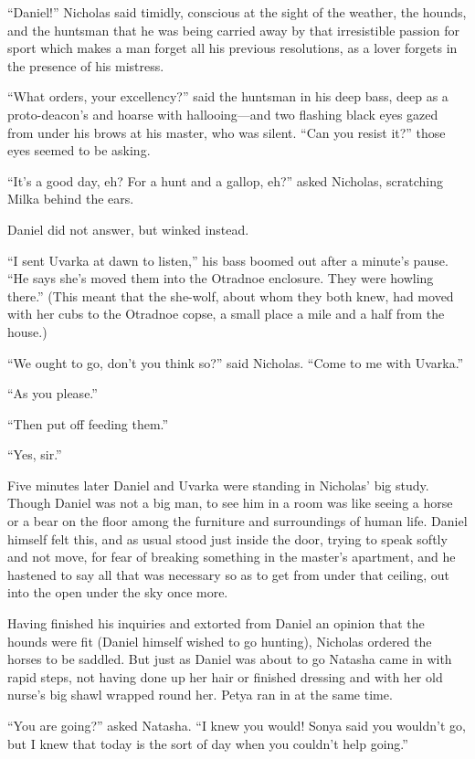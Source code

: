 ``Daniel!'' Nicholas said timidly, conscious at the sight of the
weather, the hounds, and the huntsman that he was being carried
away by that irresistible passion for sport which makes a man
forget all his previous resolutions, as a lover forgets in the
presence of his mistress.

``What orders, your excellency?'' said the huntsman in his deep
bass, deep as a proto-deacon's and hoarse with hallooing---and
two flashing black eyes gazed from under his brows at his master,
who was silent. ``Can you resist it?'' those eyes seemed to be
asking.

``It's a good day, eh? For a hunt and a gallop, eh?'' asked
Nicholas, scratching Milka behind the ears.

Daniel did not answer, but winked instead.

``I sent Uvarka at dawn to listen,'' his bass boomed out after a
minute's pause. ``He says she's moved them into the Otradnoe
enclosure. They were howling there.'' (This meant that the
she-wolf, about whom they both knew, had moved with her cubs to
the Otradnoe copse, a small place a mile and a half from the
house.)

``We ought to go, don't you think so?'' said Nicholas. ``Come to
me with Uvarka.''

``As you please.''

``Then put off feeding them.''

``Yes, sir.''

Five minutes later Daniel and Uvarka were standing in Nicholas'
big study. Though Daniel was not a big man, to see him in a room
was like seeing a horse or a bear on the floor among the
furniture and surroundings of human life. Daniel himself felt
this, and as usual stood just inside the door, trying to speak
softly and not move, for fear of breaking something in the
master's apartment, and he hastened to say all that was necessary
so as to get from under that ceiling, out into the open under the
sky once more.

Having finished his inquiries and extorted from Daniel an opinion
that the hounds were fit (Daniel himself wished to go hunting),
Nicholas ordered the horses to be saddled. But just as Daniel was
about to go Natasha came in with rapid steps, not having done up
her hair or finished dressing and with her old nurse's big shawl
wrapped round her.  Petya ran in at the same time.

``You are going?'' asked Natasha. ``I knew you would! Sonya said
you wouldn't go, but I knew that today is the sort of day when
you couldn't help going.''

